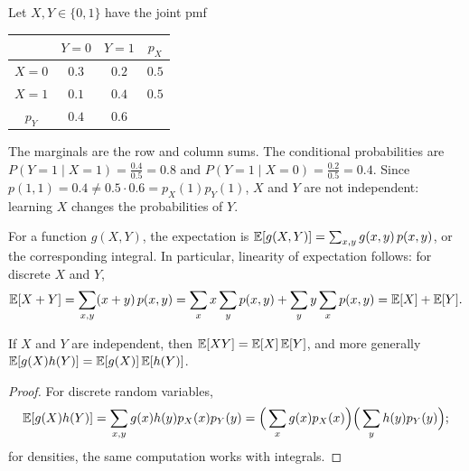 \begin{example}\label{L4-ex:joint-table}
    Let $X, Y \in \{0, 1\}$ have the joint pmf
    \begin{center}
        \renewcommand{\arraystretch}{1.2}
        \begin{tabular}{c|cc|c}
            & $Y = 0$ & $Y = 1$ & $p_X$ \\
            \hline
            $X = 0$ & $0.3$ & $0.2$ & $0.5$ \\
            $X = 1$ & $0.1$ & $0.4$ & $0.5$ \\
            \hline
            $p_Y$ & $0.4$ & $0.6$ &
        \end{tabular}
    \end{center}
    The marginals are the row and column sums. The conditional probabilities are $P(Y = 1 \mid X = 1) = \frac{0.4}{0.5} = 0.8$ and $P(Y = 1 \mid X = 0) = \frac{0.2}{0.5} = 0.4$. Since $p(1, 1) = 0.4 \neq 0.5 \cdot 0.6 = p_X(1)p_Y(1)$, $X$ and $Y$ are not independent: learning $X$ changes the probabilities of $Y$.
\end{example}

For a function $g(X, Y)$, the expectation is $\mathbb{E}[g(X, Y)] = \sum_{x, y} g(x, y)\,p(x, y)$, or the corresponding integral. In particular, linearity of expectation follows: for discrete $X$ and $Y$,
\[\mathbb{E}[X + Y] = \sum_{x, y}(x + y)\,p(x, y) = \sum_x x\sum_y p(x, y) + \sum_y y\sum_x p(x, y) = \mathbb{E}[X] + \mathbb{E}[Y].\]

\begin{proposition}\label{L4-prop:independent-product}
    If $X$ and $Y$ are independent, then $\mathbb{E}[XY] = \mathbb{E}[X]\,\mathbb{E}[Y]$, and more generally $\mathbb{E}[g(X)h(Y)] = \mathbb{E}[g(X)]\,\mathbb{E}[h(Y)]$.
\end{proposition}

\begin{proof}
    For discrete random variables,
    \[\mathbb{E}[g(X)h(Y)] = \sum_{x, y} g(x)h(y)p_X(x)p_Y(y) = \Big(\sum_x g(x)p_X(x)\Big)\Big(\sum_y h(y)p_Y(y)\Big);\]
    for densities, the same computation works with integrals.
\end{proof}

